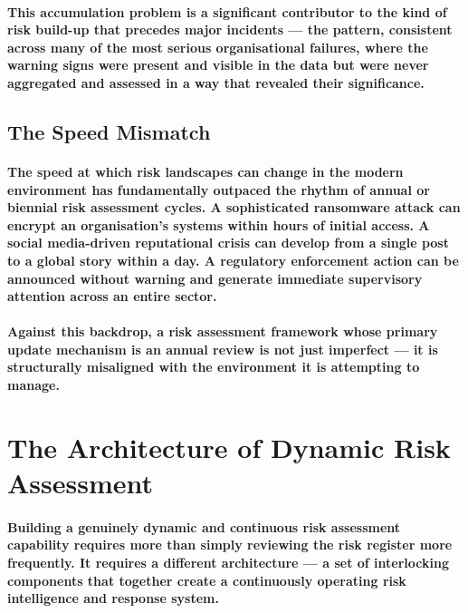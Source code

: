 \paragraph{This accumulation problem is a significant contributor to the kind of risk build-up that precedes major incidents — the pattern, consistent across many of the most serious organisational failures, where the warning signs were present and visible in the data but were never aggregated and assessed in a way that revealed their significance.}

\subsection{The Speed Mismatch}
\paragraph{The speed at which risk landscapes can change in the modern environment has fundamentally outpaced the rhythm of annual or biennial risk assessment cycles. A sophisticated ransomware attack can encrypt an organisation's systems within hours of initial access. A social media-driven reputational crisis can develop from a single post to a global story within a day. A regulatory enforcement action can be announced without warning and generate immediate supervisory attention across an entire sector.}
\paragraph{Against this backdrop, a risk assessment framework whose primary update mechanism is an annual review is not just imperfect — it is structurally misaligned with the environment it is attempting to manage.}

\section{The Architecture of Dynamic Risk Assessment}
\paragraph{Building a genuinely dynamic and continuous risk assessment capability requires more than simply reviewing the risk register more frequently. It requires a different architecture — a set of interlocking components that together create a continuously operating risk intelligence and response system.}

